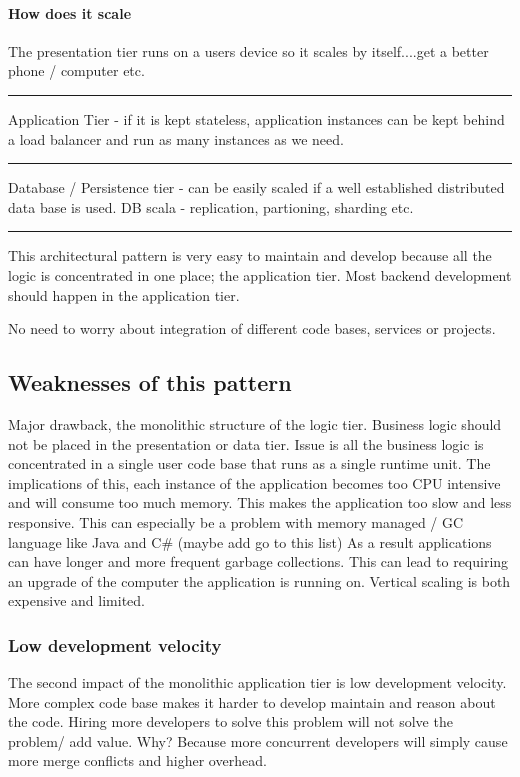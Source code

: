 \documentclass[a4paper, 11pt]{book}
\begin{document}
    \paragraph{How does it scale}
    The presentation tier runs on a users device so it scales by itself....get a better phone / computer etc.
    \hrule
    Application Tier - if it is kept stateless, application instances can be kept behind a load balancer and run as many instances as we need.
    \hrule
    Database / Persistence tier - can be easily scaled if a well established distributed data base is used. DB scala - replication, partioning, sharding etc.

    \hrule
    This architectural pattern is very easy to maintain and develop because all the logic is concentrated in one place; the application tier.
    Most backend development should happen in the application tier.

    No need to worry about integration of different code bases, services or projects.

    \subsection{Weaknesses of this pattern}

    Major drawback, the monolithic structure of the logic tier.
    Business logic should not be placed in the presentation or data tier.
    Issue is all the business logic is concentrated in a single user code base that runs as a single runtime unit.
    The implications of this, each instance of the application becomes too CPU intensive and will consume too much memory.
    This makes the application too slow and less responsive.
    This can especially be a problem with memory managed / GC language like Java and C\# (maybe add go to this list)
    As a result applications can have longer and more frequent garbage collections.
    This can lead to requiring an upgrade of the computer the application is running on.
    Vertical scaling is both expensive and limited.

    \subsubsection{Low development velocity}
    The second impact of the monolithic application tier is low development velocity.
    More complex code base makes it harder to develop maintain and reason about the code.
    Hiring more developers to solve this problem will not solve the problem/ add value.
    Why?
    Because more concurrent developers will simply cause more merge conflicts and higher overhead.
\end{document}
